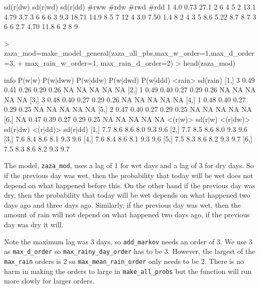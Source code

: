 \documentclass{article}
\begin{document}
\begin{Schunk}
\begin{Soutput}
  sd(r|dw) sd(r|wd) sd(r|dd) #rww #rdw #rwd #rdd
1      4.0     0.73     27.1    2    6    4    5
2     13.1     4.79      3.7    3    6    6    6
3      9.3    18.71     14.9    8    5    7   12
4      3.0     7.50      1.4    8    2    4    3
5      8.6     5.22      8.7    8    7    3    6
6      2.7     4.70     11.8    6    2    8    9
\end{Soutput}
\begin{Sinput}
> zaza_mod=make_model_general(zaza_all_pbs,max_w_order=1,max_d_order=3,
+                             max_rain_w_order=1, max_rain_d_order=2)
> head(zaza_mod)
\end{Sinput}
\begin{Soutput}
     info P(w|w) P(w|dww) P(w|ddw) P(w|dwd) P(w|ddd)          <rain> sd(rain)
[1,]    3   0.49     0.41     0.26     0.29     0.26 NA NA NA     NA       NA
[2,]    1   0.49     0.40     0.27     0.29     0.26 NA NA NA     NA       NA
[3,]    3   0.48     0.40     0.27     0.29     0.26 NA NA NA     NA       NA
[4,]    1   0.48     0.40     0.27     0.29     0.25 NA NA NA     NA       NA
[5,]    2   0.47     0.40     0.27     0.29     0.25 NA NA NA     NA       NA
[6,]   NA   0.47     0.39     0.27     0.29     0.25 NA NA NA     NA       NA
     <(r|w)> sd(r|w) <(r|dw)> sd(r|dw) <(r|dd)> sd(r|dd)
[1,]     7.7     8.6      8.6      8.0      9.3      9.6
[2,]     7.7     8.5      8.6      8.0      9.3      9.6
[3,]     7.6     8.4      8.6      8.1      9.3      9.6
[4,]     7.6     8.4      8.6      8.1      9.3      9.6
[5,]     7.5     8.3      8.6      8.2      9.3      9.7
[6,]     7.5     8.3      8.6      8.2      9.3      9.7
\end{Soutput}
\end{Schunk}

The model, {\tt zaza\_mod}, uses a lag of 1 for wet days and
a lag of 3 for dry days.  So if the previous day was wet, then the 
probability that today will be wet does not depend on what happened
before this.  On the other hand if the previous day was dry, then the
probability that today will be wet depends on what happened two days
ago and three days ago.  Similarly, if the previous day was wet,
then the amount of rain will not depend on what happened two days
ago, if the previous day was dry it will.

Note the maximum lag was 3 days, so {\tt add\_markov} needs an
order of 3.  We use 3 as {\tt max\_d\_order} so {\tt max\_rainy\_day\_order}
has to be 3.  However, the largest of the {\tt max\_rain} orders is 2
so {\tt max\_mean\_rain\_order} only needs to be 2.   There is no harm
in making the orders to large in {\tt make\_all\_probs} but the function
will run more slowly for larger orders.
\end{document}
